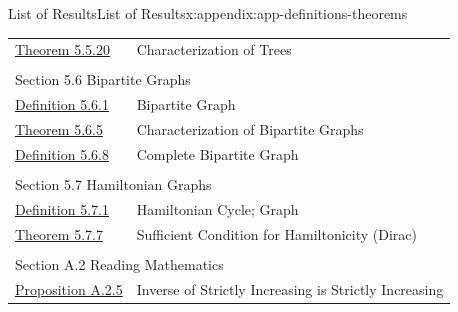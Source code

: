 \documentclass[oneside,10pt,]{book}
\numberwithin{equation}{section}
\begin{document}
\begin{appendixptx}{List of Results}{}{List of Results}{}{}{x:appendix:app-definitions-theorems}
\begin{longtable}[l]{ll}
\hyperref[x:theorem:thm-trees]{Theorem 5.5.20}& Characterization of Trees\\
\multicolumn{2}{l}{\null}\\[1.5ex] \multicolumn{2}{l}{\large Section 5.6 Bipartite Graphs}\\[0.5ex]
\hyperref[x:definition:def-bipartite]{Definition 5.6.1}& Bipartite Graph\\
\hyperref[x:theorem:thm-bipartite]{Theorem 5.6.5}& Characterization of Bipartite Graphs\\
\hyperref[x:definition:def-complete-bipartite]{Definition 5.6.8}& Complete Bipartite Graph\\
\multicolumn{2}{l}{\null}\\[1.5ex] \multicolumn{2}{l}{\large Section 5.7 Hamiltonian Graphs}\\[0.5ex]
\hyperref[x:definition:def-hamiltonian]{Definition 5.7.1}& Hamiltonian Cycle; Graph\\
\hyperref[x:theorem:thm-dirac]{Theorem 5.7.7}& Sufficient Condition for Hamiltonicity (Dirac)\\
\multicolumn{2}{l}{\null}\\[1.5ex] \multicolumn{2}{l}{\large Section A.2 Reading Mathematics}\\[0.5ex]
\hyperref[x:proposition:prop-inverse-strictly-increasing]{Proposition A.2.5}& Inverse of Strictly Increasing is Strictly Increasing\\
\end{longtable}
\end{appendixptx}
%
%
\typeout{************************************************}
\typeout{************************************************}
%
\end{document}
